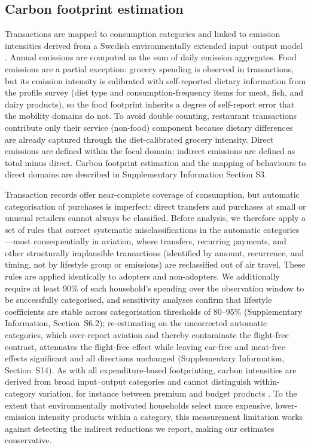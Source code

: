 \documentclass[sn-nature]{sn-jnl}
\begin{document}
\subsection{Carbon footprint estimation}
Transactions are mapped to consumption categories and linked to emission intensities derived from a Swedish environmentally extended input–output model \citep{andersson2020novel}. Annual emissions are computed as the sum of daily emission aggregates. Food emissions are a partial exception: grocery spending is observed in transactions, but its emission intensity is calibrated with self-reported dietary information from the profile survey (diet type and consumption-frequency items for meat, fish, and dairy products), so the food footprint inherits a degree of self-report error that the mobility domains do not. To avoid double counting, restaurant transactions contribute only their service (non-food) component because dietary differences are already captured through the diet-calibrated grocery intensity. Direct emissions are defined within the focal domain; indirect emissions are defined as total minus direct. Carbon footprint estimation and the mapping of behaviours to direct domains are described in Supplementary Information Section S3.

Transaction records offer near-complete coverage of consumption, but automatic categorisation of purchases is imperfect: direct transfers and purchases at small or unusual retailers cannot always be classified. Before analysis, we therefore apply a set of rules that correct systematic misclassifications in the automatic categories---most consequentially in aviation, where transfers, recurring payments, and other structurally implausible transactions (identified by amount, recurrence, and timing, not by lifestyle group or emissions) are reclassified out of air travel. These rules are applied identically to adopters and non-adopters. We additionally require at least 90\% of each household's spending over the observation window to be successfully categorised, and sensitivity analyses confirm that lifestyle coefficients are stable across categorisation thresholds of 80--95\% (Supplementary Information, Section~S6.2); re-estimating on the uncorrected automatic categories, which over-report aviation and thereby contaminate the flight-free contrast, attenuates the flight-free effect while leaving car-free and meat-free effects significant and all directions unchanged (Supplementary Information, Section~S14). As with all expenditure-based footprinting, carbon intensities are derived from broad input--output categories and cannot distinguish within-category variation, for instance between premium and budget products \citep{deHaan}. To the extent that environmentally motivated households select more expensive, lower-emission intensity products within a category, this measurement limitation works against detecting the indirect reductions we report, making our estimates conservative.
\end{document}
